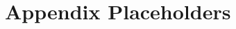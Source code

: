 \documentclass[11pt]{article}
\newcommand{\todo}[1]{\textcolor{red!65!black}{\textbf{TODO:} #1}}
\theoremstyle{definition}
\theoremstyle{plain}
\theoremstyle{remark}
\begin{document}
\section{Appendix Placeholders}



\end{document}
